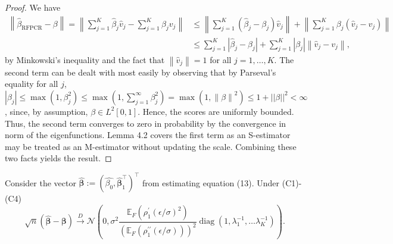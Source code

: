 \documentclass[11pt]{article}
\newenvironment{customcor}[1]
  {\renewcommand\theinnercustomcor{#1}\innercustomcor}
  {\endinnercustomcor}
\DeclareMathOperator{\diag}{diag}
\begin{document}
\begin{proof}
We have
\begin{align*}
\left\| \widehat{\beta}_{{\scriptscriptstyle \text{RFPCR}}} - \beta \right\|  = \left\| \sum_{j=1}^K \widehat{\beta}_{j} \widehat{v}_{j} - \sum_{j=1}^K \beta_j v_j  \right\| \nonumber  & \leq \left\| \sum_{j=1}^K \left( \widehat{\beta}_{j} - \beta_j \right) \widehat{v}_{j} \right\| + \left\| \sum_{j=1}^K \beta_j \left(\widehat{v}_{j} - v_j \right) \right\| \nonumber 
\\ &\leq \sum_{j=1}^K \left| \widehat{\beta}_{j} - \beta_j \right| + \sum_{j=1}^K \left| \beta_j \right| \left\| \widehat{v}_{j} - v_j \right\|,
\end{align*}
by Minkowski's inequality and the fact that $\left\|\widehat{v}_{j} \right\| = 1$ for all $j = 1, \ldots, K$. The second term can be dealt with most easily by observing that by Parseval's equality for all $j$, $\left|\beta_j\right| \leq \max(1, \beta_j^2)\leq  \max(1, \sum_{j=1}^{\infty}\beta_j^2) = \max(1, \left\| \beta \right\|^2) \leq 1 + || \beta ||^2 < \infty$, since, by assumption, $\beta \in L^2 \left[0,1\right]$. Hence, the scores are uniformly bounded. Thus, the second term converges to zero in probability by the convergence in norm of the eigenfunctions. Lemma 4.2 covers the first term as an S-estimator may be treated as an M-estimator without updating the scale. Combining these two facts yields the result.

\end{proof}

\begin{customcor}{4.2}
Consider the vector $\widehat{\boldsymbol{\beta}} := \left( \widehat{\beta_0}, \widehat{\boldsymbol{\beta}}_1^{\top} \right)^{\top}$ from estimating equation (13). Under (C1)-(C4)
\begin{equation*}
\sqrt{n}(\widehat{\boldsymbol{\beta}} - \boldsymbol{\beta} ) \xrightarrow{D} \mathcal{N}\left(0,  \sigma^2 \frac{\mathbb{E}_F \left( \rho_{1}^{\prime}(\epsilon/ \sigma)^2 \right)}{(\mathbb{E}_F \left( \rho_1^{\prime \prime}(\epsilon/\sigma) \right))^2 } \diag\left(1, \lambda_1^{-1}, \ldots \lambda_K^{-1} \right) \right).
\end{equation*}
\end{customcor}
\end{document}
